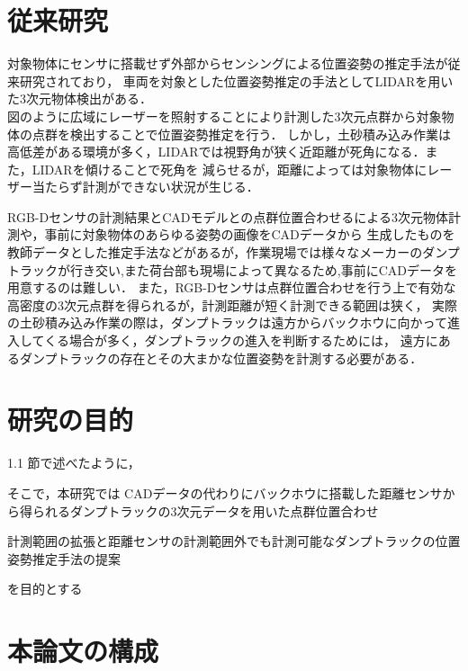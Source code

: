 \newpage
\section{従来研究}
対象物体にセンサに搭載せず外部からセンシングによる位置姿勢の推定手法が従来研究されており，
車両を対象とした位置姿勢推定の手法としてLIDARを用いた3次元物体検出がある．\cite{Zhang2017}\cite{Chen2017}\cite{Lang2019}\\
図のように広域にレーザーを照射することにより計測した3次元点群から対象物体の点群を検出することで位置姿勢推定を行う．
しかし，土砂積み込み作業は高低差がある環境が多く，LIDARでは視野角が狭く近距離が死角になる．また，LIDARを傾けることで死角を
減らせるが，距離によっては対象物体にレーザー当たらず計測ができない状況が生じる．

\par
RGB-Dセンサの計測結果とCADモデルとの点群位置合わせるによる3次元物体計測や，事前に対象物体のあらゆる姿勢の画像をCADデータから
生成したものを教師データとした推定手法などがあるが，作業現場では様々なメーカーのダンプトラックが行き交い,また荷台部も現場によって異なるため,事前にCADデータを用意するのは難しい．
また，RGB-Dセンサは点群位置合わせを行う上で有効な高密度の3次元点群を得られるが，計測距離が短く計測できる範囲は狭く，
実際の土砂積み込み作業の際は，ダンプトラックは遠方からバックホウに向かって進入してくる場合が多く，ダンプトラックの進入を判断するためには，
遠方にあるダンプトラックの存在とその大まかな位置姿勢を計測する必要がある．
\section{研究の目的}
1.1 節で述べたように，
\par
そこで，本研究では
CADデータの代わりにバックホウに搭載した距離センサから得られるダンプトラックの3次元データを用いた点群位置合わせ
    \begin{screen}
        \begin{center}
        計測範囲の拡張と距離センサの計測範囲外でも計測可能なダンプトラックの位置姿勢推定手法の提案
        \end{center}
    \end{screen}
を目的とする
\section{本論文の構成}
